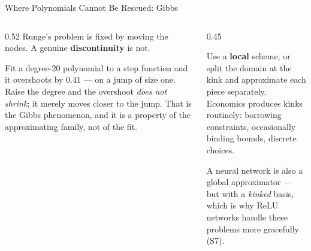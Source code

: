 \begin{frame}{Where Polynomials Cannot Be Rescued: Gibbs}
\begin{columns}[T]
\begin{column}{0.52\textwidth}
\small
Runge's problem is fixed by moving the nodes. A genuine \textbf{discontinuity} is not.
\medskip

Fit a degree-20 polynomial to a step function and it overshoots by $0.41$ --- on a jump of size one. Raise the degree and the overshoot \emph{does not shrink}; it merely moves closer to the jump. That is the Gibbs phenomenon, and it is a property of the approximating family, not of the fit.
\end{column}
\begin{column}{0.45\textwidth}
\begin{takeawaybox}[title=\textbf{What to do instead}]\small
Use a \textbf{local} scheme, or split the domain at the kink and approximate each piece separately.\\[1mm]
Economics produces kinks routinely: borrowing constraints, occasionally binding bounds, discrete choices.
\end{takeawaybox}
\medskip
\begin{cautionbox}\footnotesize
A neural network is also a global approximator --- but with a \emph{kinked} basis, which is why ReLU networks handle these problems more gracefully (S7).
\end{cautionbox}
\end{column}
\end{columns}
\vspace{1mm}
\end{frame}

